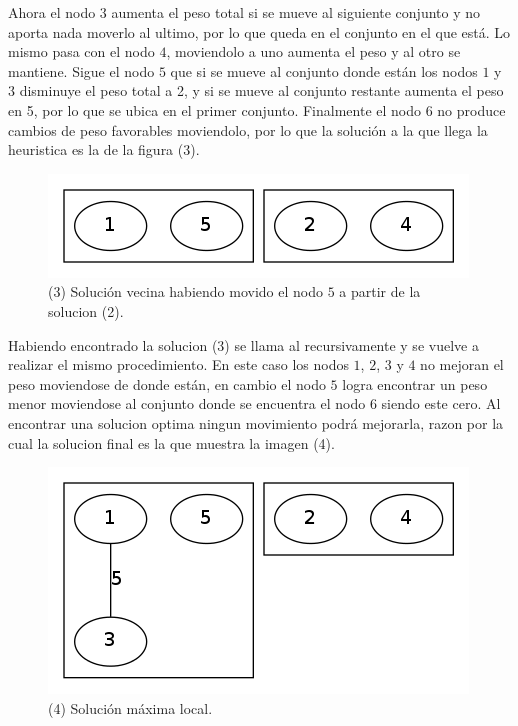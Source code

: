 Ahora el nodo $3$ aumenta el peso total si se mueve al siguiente conjunto y no aporta nada moverlo al ultimo, por lo que queda en el conjunto en el que está. Lo mismo pasa con el nodo $4$, moviendolo a uno aumenta el peso y al otro se mantiene. Sigue el nodo $5$ que si se mueve al conjunto donde están los nodos $1$ y $3$ disminuye el peso total a 2, y si se mueve al conjunto restante aumenta el peso en 5, por lo que se ubica en el primer conjunto. Finalmente el nodo $6$ no produce cambios de peso favorables moviendolo, por lo que la solución a la que llega la heuristica es la de la figura (3).

\begin{figure}[H]
\begin{center}
\includegraphics[scale=0.4]{./img/greedy3.png}
\caption{(3) Solución vecina habiendo movido el nodo $5$ a partir de la solucion (2).}
\end{center}
\end{figure}

Habiendo encontrado la solucion (3) se llama al recursivamente y se vuelve a realizar el mismo procedimiento. En este caso los nodos $1$, $2$, $3$ y $4$ no mejoran el peso moviendose de donde están, en cambio el nodo $5$ logra encontrar un peso menor moviendose al conjunto donde se encuentra el nodo $6$ siendo este cero. Al encontrar una solucion optima ningun movimiento podrá mejorarla, razon por la cual la solucion final es la que muestra la imagen (4). 

\begin{figure}[H]
\begin{center}
\includegraphics[scale=0.4]{./img/greedy4.png}
\caption{(4) Solución máxima local.}
\end{center}
\end{figure}

